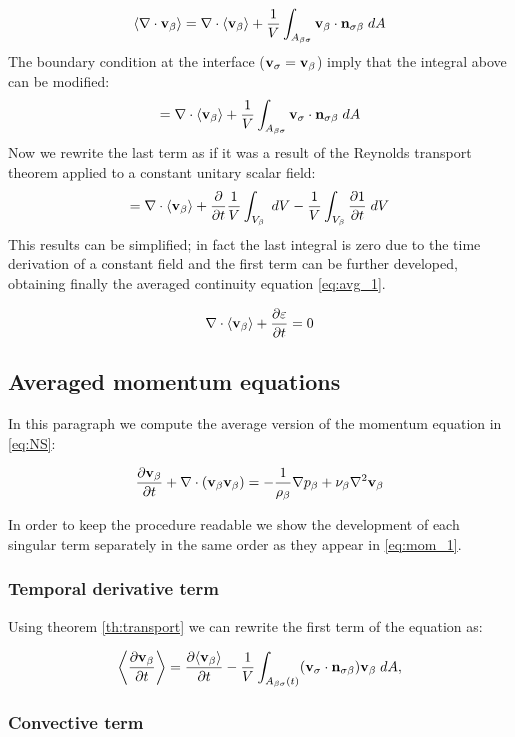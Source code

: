 $$
{\left< \nabla \cdot \textbf{v}_{\beta} \right>} = \nabla \cdot {\left< \textbf{v}_{\beta}\right>} + \dfrac{1}{V} \int_{A_{\beta \sigma}}  \textbf{v}_{\beta} \cdot \mathbf{n}_{\sigma \beta} \;dA
$$
The boundary condition at the interface ($\textbf{v}_{\sigma} = \textbf{v}_{\beta}$) imply that the integral above can be modified: 
$$=\nabla \cdot {\left< \textbf{v}_{\beta}\right>} + \dfrac{1}{V} \int_{A_{\beta \sigma}}  \textbf{v}_{\sigma} \cdot \mathbf{n}_{\sigma \beta} \;dA$$
Now we rewrite the last term as if it was a result of the Reynolds transport theorem applied to a constant unitary scalar field:
$$=\nabla \cdot {\left< \textbf{v}_{\beta}\right>} + \dfrac{\partial }{\partial t} \dfrac{1}{V} \int_{V_\beta} \;dV  - \dfrac{1}{V} \int_{V_\beta} \dfrac{\partial 1}{\partial t} \;dV $$
This results can be simplified; in fact the last integral is zero due to the time derivation of a constant field and the first term can be further developed, obtaining finally the averaged continuity equation \eqref{eq:avg_1}.

\begin{equation}
\nabla \cdot {\left< \textbf{v}_{\beta}\right>} + \dfrac{\partial \varepsilon}{\partial t} =0
\label{eq:avg_1}
\end{equation}


\subsection{Averaged momentum equations}

In this paragraph we compute the average version of the momentum equation in \eqref{eq:NS}:

\begin{equation}
\dfrac{\partial \textbf{v}_{\beta}}{\partial t} + \nabla \cdot (\textbf{v}_{\beta}\textbf{v}_{\beta}) = -\frac{1}{\rho_{\beta}} \nabla p_{\beta} + \nu_{\beta} \nabla^2  \textbf{v}_{\beta}
\label{eq:mom_1}
\end{equation}

In order to keep the procedure readable we show the development of each singular term separately in the same order as they appear in \eqref{eq:mom_1}.

\subsubsection{Temporal derivative term}

Using theorem \ref{th:transport} we can rewrite the first term of the equation as:

\begin{equation}
{\left< \dfrac{\partial \textbf{v}_{\beta}}{\partial t} \right>} = \dfrac{\partial {\left< \textbf{v}_{\beta}\right>}}{\partial t} -\dfrac{1}{V} \int_{A_{\beta \sigma}(t)} (\textbf{v}_{\sigma} \cdot \mathbf{n}_{\sigma \beta} ) \textbf{v}_{\beta} \;dA,
\end{equation}

\subsubsection{Convective term}

